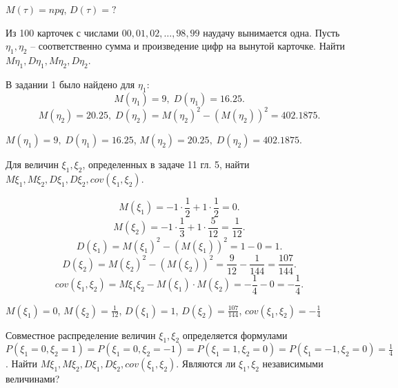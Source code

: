 \begin{result}
$M(\tau) = npq$, $D(\tau) = ?$
\end{result}

\medskip
\begin{task}{8}
  Из 100 карточек с числами $00, 01, 02, \dots, 98, 99$ наудачу вынимается одна. Пусть $\eta_1, \eta_2$ 
  -- соответственно сумма и произведение цифр на вынутой карточке. Найти $M\eta_1, D\eta_1, M\eta_2, D\eta_2$.
\end{task}

\begin{solution} В задании 1 было найдено для $\eta_1$:
\[
M(\eta_1) = 9, \; D(\eta_1) = 16.25
.\] 
\[
M(\eta_2) = 20.25, \; D(\eta_2) = M(\eta_2)^2 - (M(\eta_2))^2 = 402.1875
.\] 
\end{solution}

\begin{result}
$M(\eta_1) = 9, \; D(\eta_1) = 16.25$, $M(\eta_2) = 20.25, \; D(\eta_2) = 402.1875$.
\end{result}
\medskip
\begin{task}{9}
  Для величин $\xi_1, \xi_2$, определенных в задаче 11 гл. 5, найти $M\xi_1, M\xi_2, D\xi_1, D\xi_2,
  cov(\xi_1, \xi_2)$.
\end{task}

\begin{solution}
\[
M(\xi_1) = -1 \cdot \frac{1}{2} + 1 \cdot  \frac{1}{2} = 0
.\] 
\[
M(\xi_2) = -1 \cdot  \frac{1}{3} + 1 \cdot  \frac{5}{12} = \frac{1}{12}
.\] 
\[
D(\xi_1) = M(\xi_1)^2 - (M(\xi_1))^2 = 1 - 0 = 1
.\] 
\[
D(\xi_2) = M(\xi_2)^2 - (M(\xi_2))^2 = \frac{9}{12} - \frac{1}{144} = \frac{107}{144}
.\] 
\[
cov(\xi_1, \xi_2) = M\xi_1\xi_2 - M(\xi_1) \cdot M(\xi_2) = -\frac{1}{4} - 0 = -\frac{1}{4}
.\] 
\end{solution}

\begin{result}
$M(\xi_1) = 0$, $M(\xi_2) = \frac{1}{12}$, $D(\xi_1) = 1$, $D(\xi_2) = \frac{107}{144}$, $cov(\xi_1,
\xi_2) = -\frac{1}{4}$
\end{result}
\medskip
\begin{task}{10}
  Совместное распределение величин $\xi_1, \xi_2$ определяется формулами $P\left(\xi_1 = 0, \xi_2 = 1\right) =
  P(\xi_1 =0, \xi_2 = -1) = P(\xi_1 = 1, \xi_2 = 0) = P(\xi_1 = -1, \xi_2 = 0) = \frac{1}{4}$.
  Найти $M\xi_1, M\xi_2, D\xi_1, D\xi_2, cov(\xi_1, \xi_2)$. Являются ли $\xi_1, \xi_2$ независимыми
  величинами? 
\end{task}

